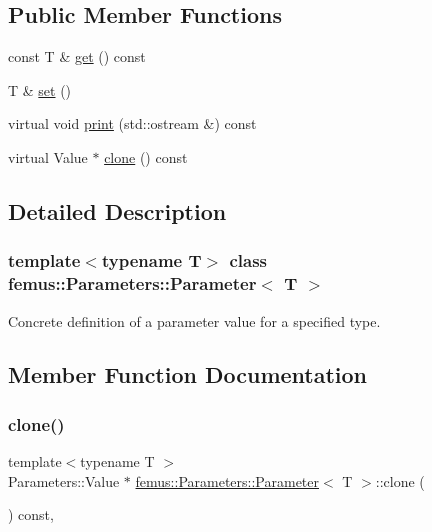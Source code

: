 \subsection*{Public Member Functions}
\begin{DoxyCompactItemize}
\item 
const T \& \mbox{\hyperlink{classfemus_1_1_parameters_1_1_parameter_ae8604847b5ed45edc3289a64e2639c8a}{get}} () const
\item 
T \& \mbox{\hyperlink{classfemus_1_1_parameters_1_1_parameter_a8fe5abea9c4f01d039cf18a96f710bb5}{set}} ()
\item 
virtual void \mbox{\hyperlink{classfemus_1_1_parameters_1_1_parameter_aecc1e861889ad36033fd905c30e5b70c}{print}} (std\+::ostream \&) const
\item 
virtual Value $\ast$ \mbox{\hyperlink{classfemus_1_1_parameters_1_1_parameter_a72962a0db46b03d8c3f071d59e1c0f40}{clone}} () const
\end{DoxyCompactItemize}


\subsection{Detailed Description}
\subsubsection*{template$<$typename T$>$\newline
class femus\+::\+Parameters\+::\+Parameter$<$ T $>$}

Concrete definition of a parameter value for a specified type. 

\subsection{Member Function Documentation}
\mbox{\label{classfemus_1_1_parameters_1_1_parameter_a72962a0db46b03d8c3f071d59e1c0f40}} 
\subsubsection{\texorpdfstring{clone()}{clone()}}
{\footnotesize\ttfamily template$<$typename T $>$ \\
Parameters\+::\+Value $\ast$ \mbox{\hyperlink{classfemus_1_1_parameters_1_1_parameter}{femus\+::\+Parameters\+::\+Parameter}}$<$ T $>$\+::clone (\begin{DoxyParamCaption}{ }\end{DoxyParamCaption}) const\hspace{0.3cm}{\ttfamily [inline]}, {\ttfamily [virtual]}}

